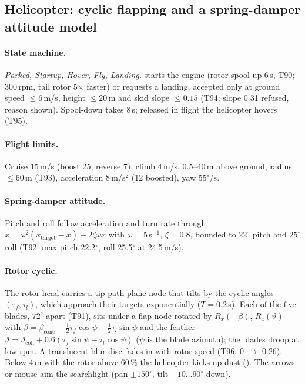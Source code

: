 \subsection{Helicopter: cyclic flapping and a spring-damper attitude model}
\paragraph{State machine.} \emph{Parked, Startup, Hover, Fly, Landing.} \code{\textbackslash} starts the engine (rotor
spool-up 6\,s, T90; 300\,rpm, tail rotor 5$\times$ faster) or requests a landing, accepted only at ground speed $\le6$\,m/s, height $\le20$\,m and skid slope $\le0.15$
(T94: slope 0.31 refused, reason shown). Spool-down takes 8\,s; released in flight the helicopter hovers (T95).

\paragraph{Flight limits.} Cruise 15\,m/s (boost 25, reverse 7), climb 4\,m/s, 0.5--40\,m above ground, radius $\le60$\,m (T93), acceleration 8\,m/s$^2$ (12 boosted), yaw 55$^\circ$/s.

\paragraph{Spring-damper attitude.} Pitch and roll follow acceleration and turn rate through
$\ddot x=\omega^2(x_\text{target}-x)-2\zeta\omega\dot x$ with $\omega=5$\,s$^{-1}$, $\zeta=0.8$, bounded to $22^\circ$ pitch and $25^\circ$ roll
(T92: max pitch 22.2$^\circ$, roll 25.5$^\circ$ at 24.5\,m/s).

\paragraph{Rotor cyclic.} The rotor head carries a tip-path-plane node that tilts by the cyclic angles $(\tau_f,\tau_l)$, which
approach their targets exponentially ($T=0.2$\,s). Each of the five blades, $72^\circ$ apart (T91), sits under a flap node rotated by $R_x(-\beta)$, $R_z(\vartheta)$ with
$\beta=\beta_\text{cone}-\tfrac12\tau_f\cos\psi-\tfrac12\tau_l\sin\psi$ and the feather
$\vartheta=\vartheta_\text{coll}+0.6(\tau_f\sin\psi-\tau_l\cos\psi)$ ($\psi$ is the blade azimuth); the blades droop at low rpm. A
translucent blur disc fades in with rotor speed (T96: 0 $\to$ 0.26). Below 4\,m with the rotor above 60\,\% the helicopter kicks up dust ().
The arrows or mouse aim the searchlight (pan $\pm150^\circ$, tilt $-10\ldots90^\circ$ down).

